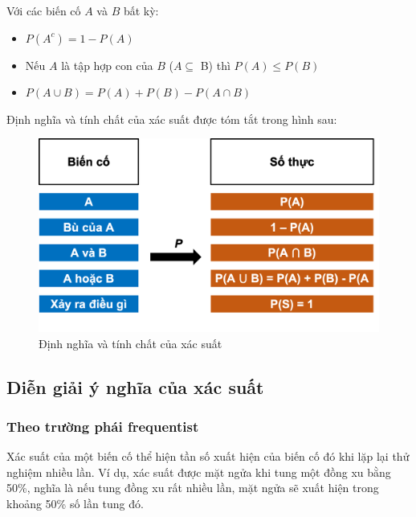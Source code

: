 \documentclass[
]{book}
\providecommand{\tightlist}{%
  \setlength{\itemsep}{0pt}\setlength{\parskip}{0pt}}
\begin{document}
Với các biến cố \(A\) và \(B\) bất kỳ:

\begin{itemize}
\tightlist
\item
  \(P(A^c) = 1 - P(A)\)
\item
  Nếu \(A\) là tập hợp con của \(B\) (\(A \subseteq\) B) thì \(P(A) \leq P(B)\)
\item
  \(P(A \cup B) = P(A) + P(B) - P(A \cap B)\)
\end{itemize}

Định nghĩa và tính chất của xác suất được tóm tắt trong hình sau:

\begin{figure}
\includegraphics[width=24.19in]{figures/Picture05} \caption{Định nghĩa và tính chất của xác suất}\label{fig:generaldefinition}
\end{figure}

\hypertarget{diux1ec5n-giux1ea3i-uxfd-nghux129a-cux1ee7a-xuxe1c-suux1ea5t}{%
\subsection{Diễn giải ý nghĩa của xác suất}\label{diux1ec5n-giux1ea3i-uxfd-nghux129a-cux1ee7a-xuxe1c-suux1ea5t}}

\hypertarget{theo-trux1b0ux1eddng-phuxe1i-frequentist}{%
\subsubsection{Theo trường phái frequentist}\label{theo-trux1b0ux1eddng-phuxe1i-frequentist}}

Xác suất của một biến cố thể hiện tần số xuất hiện của biến cố đó khi lặp lại thử nghiệm nhiều lần. Ví dụ, xác suất được mặt ngửa khi tung một đồng xu bằng 50\%, nghĩa là nếu tung đồng xu rất nhiều lần, mặt ngửa sẽ xuất hiện trong khoảng 50\% số lần tung đó.
\end{document}
